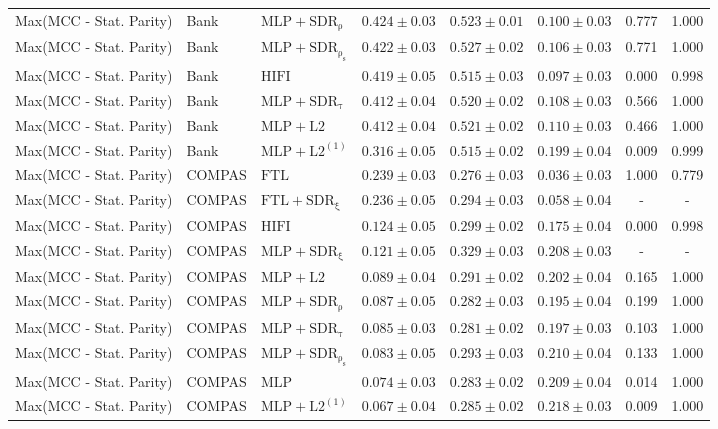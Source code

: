 \begin{table}[htbp]
\begin{tabular}{lllccccc}
Max(MCC - Stat. Parity) & Bank & $\mathrm{MLP+SDR_{\rho}}$ & $0.424 \pm0.03$ & $0.523 \pm0.01$ & $0.100 \pm0.03$ & 0.777 & 1.000 \\
Max(MCC - Stat. Parity) & Bank & $\mathrm{MLP+SDR_{\rho_s}}$ & $0.422 \pm0.03$ & $0.527 \pm0.02$ & $0.106 \pm0.03$ & 0.771 & 1.000 \\
Max(MCC - Stat. Parity) & Bank & $\mathrm{HIFI}$ & $0.419 \pm0.05$ & $0.515 \pm0.03$ & $0.097 \pm0.03$ & 0.000 & 0.998 \\
Max(MCC - Stat. Parity) & Bank & $\mathrm{MLP+SDR_{\tau}}$ & $0.412 \pm0.04$ & $0.520 \pm0.02$ & $0.108 \pm0.03$ & 0.566 & 1.000 \\
Max(MCC - Stat. Parity) & Bank & $\mathrm{MLP+L2}$ & $0.412 \pm0.04$ & $0.521 \pm0.02$ & $0.110 \pm0.03$ & 0.466 & 1.000 \\
Max(MCC - Stat. Parity) & Bank & $\mathrm{MLP+L2^{(1)}}$ & $0.316 \pm0.05$ & $0.515 \pm0.02$ & $0.199 \pm0.04$ & 0.009 & 0.999 \\
Max(MCC - Stat. Parity) & COMPAS & $\mathrm{FTL}$ & $0.239 \pm0.03$ & $0.276 \pm0.03$ & $0.036 \pm0.03$ & 1.000 & 0.779 \\
Max(MCC - Stat. Parity) & COMPAS & $\mathrm{FTL+SDR_{\xi}}$ & $0.236 \pm0.05$ & $0.294 \pm0.03$ & $0.058 \pm0.04$ & - & - \\
Max(MCC - Stat. Parity) & COMPAS & $\mathrm{HIFI}$ & $0.124 \pm0.05$ & $0.299 \pm0.02$ & $0.175 \pm0.04$ & 0.000 & 0.998 \\
Max(MCC - Stat. Parity) & COMPAS & $\mathrm{MLP+SDR_{\xi}}$ & $0.121 \pm0.05$ & $0.329 \pm0.03$ & $0.208 \pm0.03$ & - & - \\
Max(MCC - Stat. Parity) & COMPAS & $\mathrm{MLP+L2}$ & $0.089 \pm0.04$ & $0.291 \pm0.02$ & $0.202 \pm0.04$ & 0.165 & 1.000 \\
Max(MCC - Stat. Parity) & COMPAS & $\mathrm{MLP+SDR_{\rho}}$ & $0.087 \pm0.05$ & $0.282 \pm0.03$ & $0.195 \pm0.04$ & 0.199 & 1.000 \\
Max(MCC - Stat. Parity) & COMPAS & $\mathrm{MLP+SDR_{\tau}}$ & $0.085 \pm0.03$ & $0.281 \pm0.02$ & $0.197 \pm0.03$ & 0.103 & 1.000 \\
Max(MCC - Stat. Parity) & COMPAS & $\mathrm{MLP+SDR_{\rho_s}}$ & $0.083 \pm0.05$ & $0.293 \pm0.03$ & $0.210 \pm0.04$ & 0.133 & 1.000 \\
Max(MCC - Stat. Parity) & COMPAS & $\mathrm{MLP}$ & $0.074 \pm0.03$ & $0.283 \pm0.02$ & $0.209 \pm0.04$ & 0.014 & 1.000 \\
Max(MCC - Stat. Parity) & COMPAS & $\mathrm{MLP+L2^{(1)}}$ & $0.067 \pm0.04$ & $0.285 \pm0.02$ & $0.218 \pm0.03$ & 0.009 & 1.000 \\

\end{tabular}
\end{table}

